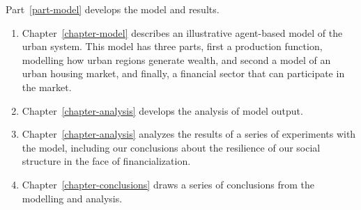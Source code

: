 Part~\ref{part-model} develops the model and results.
\begin{enumerate}
    \item Chapter~\ref{chapter-model} describes an illustrative agent-based model of the urban system. This model has three  parts, first a production function, modelling how urban regions generate wealth, and second a model of an urban housing market, and finally, a financial sector that can participate in the market. 

    \item Chapter~\ref{chapter-analysis} develops the analysis of model output.

    \item Chapter~\ref{chapter-analysis} analyzes the results of a series of experiments with the model, including our conclusions about the resilience of our social structure in the face of financialization.

    \item Chapter~\ref{chapter-conclusions} draws a series of conclusions from the modelling and analysis.
\end{enumerate}
